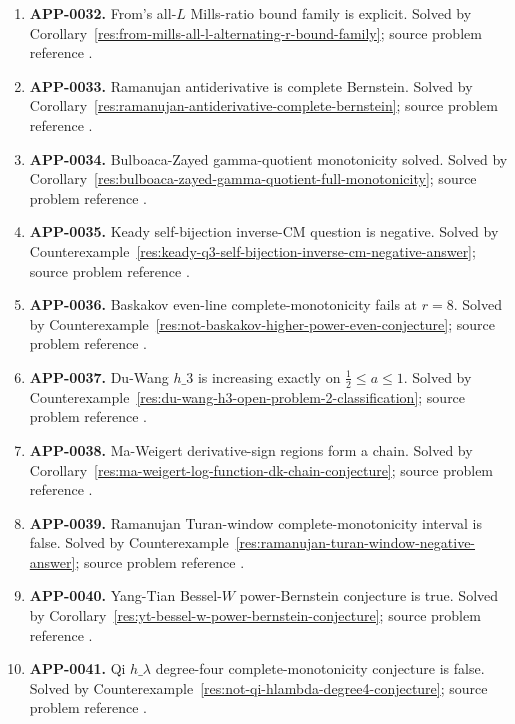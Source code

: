 \documentclass[11pt]{article}
\numberwithin{equation}{section}
\theoremstyle{definition}
\theoremstyle{remark}
\newcommand{\1}{\mathbf 1}
\begin{document}
\begin{enumerate}
\item \label{ledger:app-0032}\textbf{APP-0032.} From's all-\(L\) Mills-ratio bound family is explicit. Solved by Corollary~\ref{res:from-mills-all-l-alternating-r-bound-family}; source problem reference \cite{from-mills}.
\item \label{ledger:app-0033}\textbf{APP-0033.} Ramanujan antiderivative is complete Bernstein. Solved by Corollary~\ref{res:ramanujan-antiderivative-complete-bernstein}; source problem reference \cite{mishra-swaminathan-ramanujan}.
\item \label{ledger:app-0034}\textbf{APP-0034.} Bulboaca-Zayed gamma-quotient monotonicity solved. Solved by Corollary~\ref{res:bulboaca-zayed-gamma-quotient-full-monotonicity}; source problem reference \cite{bulboaca-zayed-gamma}.
\item \label{ledger:app-0035}\textbf{APP-0035.} Keady self-bijection inverse-CM question is negative. Solved by Counterexample~\ref{res:keady-q3-self-bijection-inverse-cm-negative-answer}; source problem reference \cite{app-app-0035-source}.
\item \label{ledger:app-0036}\textbf{APP-0036.} Baskakov even-line complete-monotonicity fails at \(r=8\). Solved by Counterexample~\ref{res:not-baskakov-higher-power-even-conjecture}; source problem reference \cite{abel-gawronski-neuschel}.
\item \label{ledger:app-0037}\textbf{APP-0037.} Du-Wang \(h\_3\) is increasing exactly on \(\frac12\le a\le1\). Solved by Counterexample~\ref{res:du-wang-h3-open-problem-2-classification}; source problem reference \cite{du-wang-h3}.
\item \label{ledger:app-0038}\textbf{APP-0038.} Ma-Weigert derivative-sign regions form a chain. Solved by Corollary~\ref{res:ma-weigert-log-function-dk-chain-conjecture}; source problem reference \cite{ma-weigert-log-functions}.
\item \label{ledger:app-0039}\textbf{APP-0039.} Ramanujan Turan-window complete-monotonicity interval is false. Solved by Counterexample~\ref{res:ramanujan-turan-window-negative-answer}; source problem reference \cite{mishra-swaminathan-ramanujan}.
\item \label{ledger:app-0040}\textbf{APP-0040.} Yang-Tian Bessel-\(W\) power-Bernstein conjecture is true. Solved by Corollary~\ref{res:yt-bessel-w-power-bernstein-conjecture}; source problem reference \cite{app-app-0040-source}.
\item \label{ledger:app-0041}\textbf{APP-0041.} Qi \(h\_\lambda\) degree-four complete-monotonicity conjecture is false. Solved by Counterexample~\ref{res:not-qi-hlambda-degree4-conjecture}; source problem reference \cite{app-app-0041-source}.

\end{enumerate}
\end{document}
